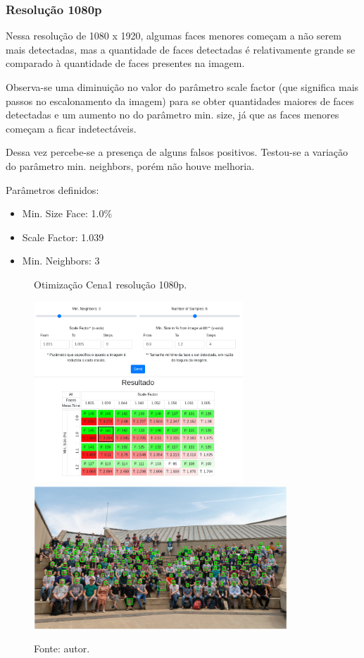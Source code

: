 \subsubsection{Resolução 1080p} \label{sssec:resolution1-2}

Nessa resolução de 1080 x 1920, algumas faces menores começam a não serem mais detectadas, mas a quantidade de faces detectadas é relativamente grande se comparado à quantidade de faces presentes na imagem.

Observa-se uma diminuição no valor do parâmetro scale factor (que significa mais passos no escalonamento da imagem) para se obter quantidades maiores de faces detectadas e um aumento no do parâmetro min. size, já que as faces menores começam a ficar indetectáveis.

Dessa vez percebe-se a presença de alguns falsos positivos. Testou-se a variação do parâmetro min. neighbors, porém não houve melhoria.

Parâmetros definidos: 
\begin{itemize}
    \item Min. Size Face: 1.0\%
    \item Scale Factor: 1.039
    \item Min. Neighbors: 3
\end{itemize}

\begin{figure}[H]
    \centering
    \caption[Otimização Cena 1 - resolução 1080p.]{Otimização Cena1 resolução 1080p.}
    \includegraphics[width=0.70\textwidth]{Cap4_Experimentos_Realizados/Figures/cena1_param_1080p_matriz.jpg}
    \includegraphics[width=0.85\textwidth]{Cap4_Experimentos_Realizados/Figures/cena1_param_1080p_faces.jpg}
    \caption*{Fonte: autor.}
    \label{fig:otimizacaoCena1_1080p}
\end{figure}

